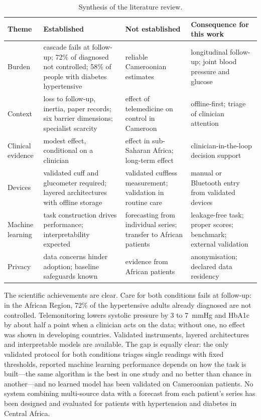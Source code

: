 \documentclass[11pt,a4paper,oneside]{report}
\begin{document}
\begin{table}[htbp]
\centering\footnotesize
\caption{Synthesis of the literature review.}\label{tab:lr-synthesis}
\begin{tabularx}{\textwidth}{@{}>{\raggedright\arraybackslash}p{2.1cm} >{\raggedright\arraybackslash}X >{\raggedright\arraybackslash}X >{\raggedright\arraybackslash}X@{}}
\toprule
\textbf{Theme} & \textbf{Established} & \textbf{Not established} & \textbf{Consequence for this work} \\
\midrule
Burden & cascade fails at follow-up; 72\% of diagnosed not controlled; 58\% of people with diabetes hypertensive & reliable Cameroonian estimates & longitudinal follow-up; joint blood pressure and glucose \\
Context & loss to follow-up, inertia, paper records; six barrier dimensions; specialist scarcity & effect of telemedicine on control in Cameroon & offline-first; triage of clinician attention \\
Clinical evidence & modest effect, conditional on a clinician & effect in sub-Saharan Africa; long-term effect & clinician-in-the-loop decision support \\
Devices & validated cuff and glucometer required; layered architectures with offline storage & validated cuffless measurement; validation in routine care & manual or Bluetooth entry from validated devices \\
Machine learning & task construction drives performance; interpretability expected & forecasting from individual series; transfer to African patients & leakage-free task; proper scores; benchmark; external validation \\
Privacy & data concerns hinder adoption; baseline safeguards known & evidence from African patients & anonymisation; declared data residency \\
\bottomrule
\end{tabularx}
\end{table}

The scientific achievements are clear. Care for both conditions fails at follow-up: in the African Region, 72\% of the hypertensive adults already diagnosed are not controlled. Telemonitoring lowers systolic pressure by 3 to 7~mmHg and HbA1c by about half a point when a clinician acts on the data; without one, no effect was shown in developing countries. Validated instruments, layered architectures and interpretable models are available. The gap is equally clear: the only validated protocol for both conditions triages single readings with fixed thresholds, reported machine learning performance depends on how the task is built---the same algorithm is the best in one study and no better than chance in another---and no learned model has been validated on Cameroonian patients. No system combining multi-source data with a forecast from each patient's series has been designed and evaluated for patients with hypertension and diabetes in Central Africa.
\end{document}
